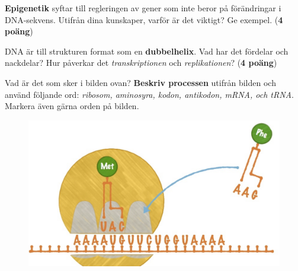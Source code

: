 \documentclass{exam}
\begin{document}
\begin{questions}
\break

\vspace{5mm} %
\begin{center}
\end{center}

\question \textbf{Epigenetik} syftar till regleringen av gener som inte beror på förändringar i DNA-sekvens. Utifrån dina kunskaper, varför är det viktigt? Ge exempel. (\textbf{4 poäng})
\vspace{90mm}

\question DNA är till strukturen format som en \textbf{dubbelhelix}. Vad har det fördelar och nackdelar? Hur påverkar det \textit{transkriptionen} och \textit{replikationen}? (\textbf{4 poäng})
\break

\break
\vspace{10mm} %
\question 
Vad är det som sker i bilden ovan? \textbf{Beskriv processen} utifrån bilden och använd följande ord: \textit{ribosom, aminosyra, kodon, antikodon, mRNA, och tRNA}. Markera även gärna orden på bilden.
\begin{figure}
    \centering
    \includegraphics[width=0.5\linewidth]{Screenshot 2023-10-05 23.14.36.png}
    
    
\end{figure}


\end{questions}
\end{document}
